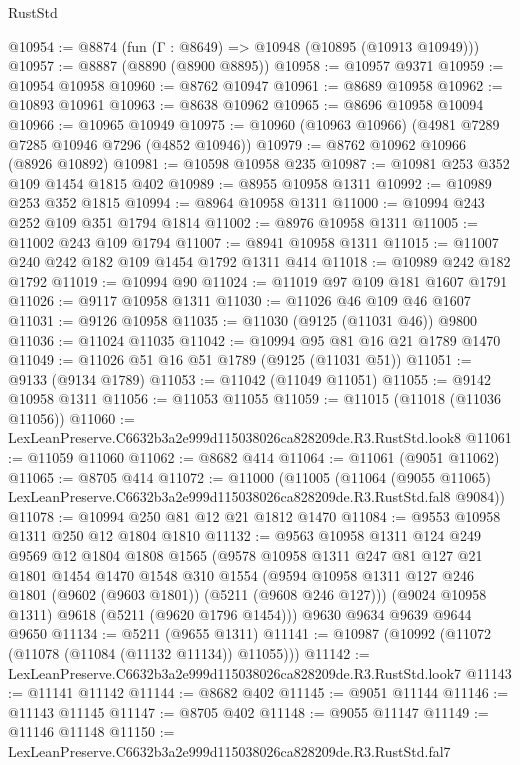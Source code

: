 \begin{lexlean}{RustStd}
\begin{coremodule}
@10954 := @8874 (fun (Γ : @8649) => @10948 (@10895 (@10913 @10949)))
@10957 := @8887 (@8890 (@8900 @8895))
@10958 := @10957 @9371
@10959 := @10954 @10958
@10960 := @8762 @10947
@10961 := @8689 @10958
@10962 := @10893 @10961
@10963 := @8638 @10962
@10965 := @8696 @10958 @10094
@10966 := @10965 @10949
@10975 := @10960 (@10963 @10966) (@4981 @7289 @7285 @10946 @7296 (@4852 @10946))
@10979 := @8762 @10962 @10966 (@8926 @10892)
@10981 := @10598 @10958 @235
@10987 := @10981 @253 @352 @109 @1454 @1815 @402
@10989 := @8955 @10958 @1311
@10992 := @10989 @253 @352 @1815
@10994 := @8964 @10958 @1311
@11000 := @10994 @243 @252 @109 @351 @1794 @1814
@11002 := @8976 @10958 @1311
@11005 := @11002 @243 @109 @1794
@11007 := @8941 @10958 @1311
@11015 := @11007 @240 @242 @182 @109 @1454 @1792 @1311 @414
@11018 := @10989 @242 @182 @1792
@11019 := @10994 @90
@11024 := @11019 @97 @109 @181 @1607 @1791
@11026 := @9117 @10958 @1311
@11030 := @11026 @46 @109 @46 @1607
@11031 := @9126 @10958
@11035 := @11030 (@9125 (@11031 @46)) @9800
@11036 := @11024 @11035
@11042 := @10994 @95 @81 @16 @21 @1789 @1470
@11049 := @11026 @51 @16 @51 @1789 (@9125 (@11031 @51))
@11051 := @9133 (@9134 @1789)
@11053 := @11042 (@11049 @11051)
@11055 := @9142 @10958 @1311
@11056 := @11053 @11055
@11059 := @11015 (@11018 (@11036 @11056))
@11060 := LexLeanPreserve.C6632b3a2e999d115038026ca828209de.R3.RustStd.look8
@11061 := @11059 @11060
@11062 := @8682 @414
@11064 := @11061 (@9051 @11062)
@11065 := @8705 @414
@11072 := @11000
    (@11005
      (@11064
        (@9055 @11065)
        LexLeanPreserve.C6632b3a2e999d115038026ca828209de.R3.RustStd.fal8
        @9084))
@11078 := @10994 @250 @81 @12 @21 @1812 @1470
@11084 := @9553 @10958 @1311 @250 @12 @1804 @1810
@11132 := @9563
    @10958
    @1311
    @124
    @249
    @9569
    @12
    @1804
    @1808
    @1565
    (@9578
      @10958
      @1311
      @247
      @81
      @127
      @21
      @1801
      @1454
      @1470
      @1548
      @310
      @1554
      (@9594 @10958 @1311 @127 @246 @1801 (@9602 (@9603 @1801)) (@5211 (@9608 @246 @127)))
      (@9024 @10958 @1311)
      @9618
      (@5211 (@9620 @1796 @1454)))
    @9630
    @9634
    @9639
    @9644
    @9650
@11134 := @5211 (@9655 @1311)
@11141 := @10987 (@10992 (@11072 (@11078 (@11084 (@11132 @11134)) @11055)))
@11142 := LexLeanPreserve.C6632b3a2e999d115038026ca828209de.R3.RustStd.look7
@11143 := @11141 @11142
@11144 := @8682 @402
@11145 := @9051 @11144
@11146 := @11143 @11145
@11147 := @8705 @402
@11148 := @9055 @11147
@11149 := @11146 @11148
@11150 := LexLeanPreserve.C6632b3a2e999d115038026ca828209de.R3.RustStd.fal7

\end{coremodule}
\end{lexlean}

